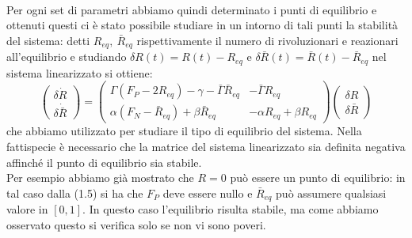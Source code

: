 \\
Per ogni set di parametri abbiamo quindi determinato i punti di equilibrio e ottenuti questi ci è stato possibile studiare in un intorno di tali punti la stabilità del sistema: detti $R_{eq},\ \bar{R}_{eq}$ rispettivamente il numero di rivoluzionari e reazionari all'equilibrio e studiando $\delta R(t)=R(t)- R_{eq}$ e $\delta \bar{R}(t)=\bar{R}(t)-\bar R_{eq}$ nel sistema linearizzato si ottiene:
\begin{equation}
	\begin{pmatrix}
		\delta \dot{R}\\ 
		\delta \dot{\bar{R}}
	\end{pmatrix}
	=\begin{pmatrix}
		\Gamma(F_P-2R_{eq})-\gamma-\bar{\Gamma} \bar{R}_{eq} & -\bar{\Gamma}R_{eq}\\
		\alpha(F_{N}-\bar{R}_{eq})+\beta \bar{R}_{eq} & -\alpha R_{eq}+\beta R_{eq}
	\end{pmatrix}
	\begin{pmatrix}
		\delta R\\
		\delta \bar{R}
	\end{pmatrix}
\end{equation} 
che abbiamo utilizzato per studiare il tipo di equilibrio del sistema. Nella fattispecie è necessario che la matrice del sistema linearizzato sia definita negativa affinché il punto di equilibrio sia stabile.\\
Per esempio abbiamo già mostrato che $R=0$ può essere un punto di equilibrio: in tal caso dalla (1.5) si ha che $F_P$ deve essere nullo e $\bar R_{eq}$ può assumere qualsiasi valore in $[0,1]$. In questo caso l'equilibrio risulta stabile, ma come abbiamo osservato questo si verifica solo se non vi sono poveri.\\
